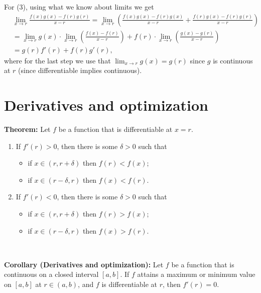 \documentclass[12pt]{amsart}
\numberwithin{equation}{section}
\theoremstyle{plain} %
\theoremstyle{definition}
\theoremstyle{remark}
\begin{document}
\begin{enumerate}
\begin{framed}
  For (3), using what we know about limits we get 
$$
\begin{aligned}
& \lim_{x \to r} \frac{f(x)g(x) - f(r)g(r)}{x-r} 
=  \lim_{x \to r} \left(\frac{f(x)g(x) - f(r)g(x)}{x-r}  + \frac{f(r)g(x) -     f(r)g(r)}{x-r} \right) \\
& =  \lim_{x \to r} g(x) \cdot \lim_{x \to r}\left(\frac{f(x) - f(r)}{x-r}\right)  
+ f(r) \cdot \lim_{x \to r} \left(\frac{g(x) -     g(r)}{x-r} \right)  \\
&= g(r) f'(r) + f(r) g'(r),
\end{aligned}
$$
where for the last step we use that $\lim_{x \to r} g(x) = g(r)$ since $g$ is continuous at $r$ (since differentiable implies continuous).

 \end{framed}
 
 \end{enumerate}
 
 
	\section*{Derivatives and optimization}


 
 \begin{framed} 
 \noindent \textbf{Theorem:} Let $f$ be a function that is differentiable at $x=r$.
 \begin{enumerate}
 \item 
 If $f'(r) > 0$, then there is some $\delta>0$ such that 
 \begin{itemize}
 \item if $x\in (r,r+\delta)$ then $f(r) < f(x)$;
  \item if $x\in (r-\delta,r)$ then $f(x) < f(r)$.
  \end{itemize}
  
  \item  If $f'(r) < 0$, then there is some $\delta>0$ such that 
  \begin{itemize}
 \item if $x\in (r,r+\delta)$ then $f(r) > f(x)$;
 \item if $x\in (r-\delta,r)$ then $f(x) > f(r)$.
  \end{itemize}
  \end{enumerate}
  
  \
  
  \noindent \textbf{Corollary (Derivatives and optimization):}
  Let $f$ be a function that is continuous on a closed interval $[a,b]$. If $f$ attains a maximum or minimum value on $[a,b]$ at $r\in (a,b)$, and $f$ is differentiable at $r$, then $f'(r)=0$.
  
 \end{framed}
 
\end{document}
